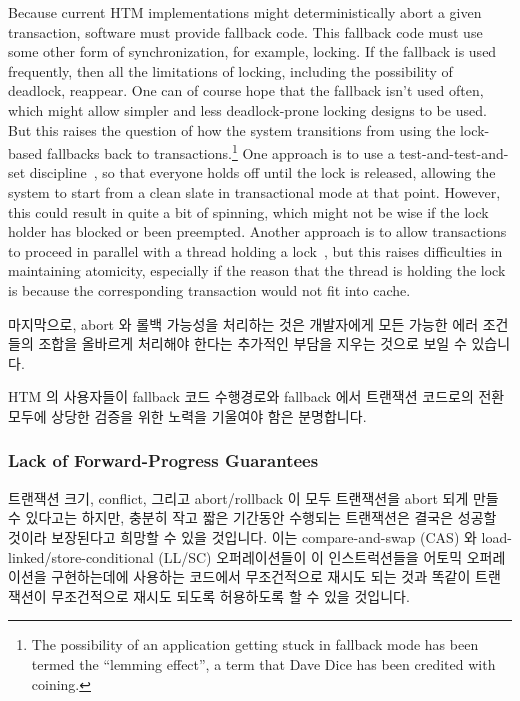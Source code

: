 Because current HTM implementations might deterministically abort a
given transaction, software must provide fallback code.
This fallback code must use some other form of synchronization, for
example, locking.
If the fallback is used frequently, then all the limitations of locking,
including the possibility of deadlock, reappear.
One can of course hope that the fallback isn't used often, which might
allow simpler and less deadlock-prone locking designs to be used.
But this raises the question of how the system transitions from using
the lock-based fallbacks back to transactions.\footnote{
	The possibility of an application getting stuck in fallback
	mode has been termed the ``lemming effect'', a term that
	Dave Dice has been credited with coining.}
One approach is to use a test-and-test-and-set discipline~\cite{Martinez02a},
so that everyone holds off until the lock is released, allowing the
system to start from a clean slate in transactional mode at that point.
However, this could result in quite a bit of spinning, which might not
be wise if the lock holder has blocked or been preempted.
Another approach is to allow transactions to proceed in parallel with
a thread holding a lock~\cite{Martinez02a}, but this raises difficulties
in maintaining atomicity, especially if the reason that the thread is
holding the lock is because the corresponding transaction would not fit
into cache.
\fi

마지막으로, abort 와 롤백 가능성을 처리하는 것은 개발자에게 모든 가능한 에러
조건들의 조합을 올바르게 처리해야 한다는 추가적인 부담을 지우는 것으로 보일 수
있습니다.

HTM 의 사용자들이 fallback 코드 수행경로와 fallback 에서 트랜잭션 코드로의 전환
모두에 상당한 검증을 위한 노력을 기울여야 함은 분명합니다.
\iffalse

Finally, dealing with the possibility of aborts and rollbacks seems to
put an additional burden on the developer, who must correctly handle
all combinations of possible error conditions.

It is clear that users of HTM must put considerable validation effort
into testing both the fallback code paths and transition from fallback
code back to transactional code.
\fi

\subsubsection{Lack of Forward-Progress Guarantees}
\label{sec:future:Lack of Forward-Progress Guarantees}

트랜잭션 크기, conflict, 그리고 abort/rollback 이 모두 트랜잭션을 abort 되게
만들 수 있다고는 하지만, 충분히 작고 짧은 기간동안 수행되는 트랜잭션은 결국은
성공할 것이라 보장된다고 희망할 수 있을 것입니다.
이는 compare-and-swap (CAS) 와 load-linked/store-conditional (LL/SC)
오퍼레이션들이 이 인스트럭션들을 어토믹 오퍼레이션을 구현하는데에 사용하는
코드에서 무조건적으로 재시도 되는 것과 똑같이 트랜잭션이 무조건적으로 재시도
되도록 허용하도록 할 수 있을 것입니다.

